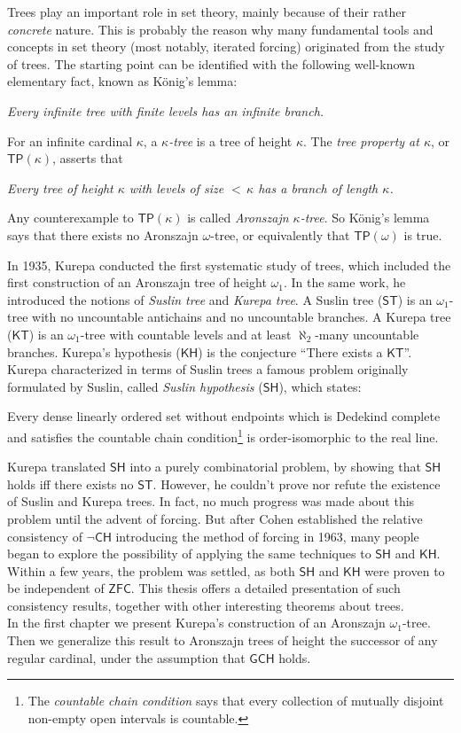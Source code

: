 \documentclass[11pt,a4paper]{report}
\theoremstyle{definition}
\theoremstyle{num.custom-title}
\theoremstyle{custom-title}
\newcommand{\ZFC}{\ensuremath{\mathsf{ZFC}}\xspace}
\newcommand{\TP}{\ensuremath{\mathsf{TP}}\xspace}
\newcommand{\GCH}{\ensuremath{\mathsf{GCH}}\xspace}
\newcommand{\CH}{\ensuremath{\mathsf{CH}}\xspace}
\newcommand{\SH}{\ensuremath{\mathsf{SH}}\xspace}
\newcommand{\ST}{\ensuremath{\mathsf{ST}}\xspace}
\newcommand{\KT}{\ensuremath{\mathsf{KT}}\xspace}
\newcommand{\KH}{\ensuremath{\mathsf{KH}}\xspace}
\begin{document}
Trees play an important role in set theory, mainly because of their rather \emph{concrete} nature. This is probably the reason why many fundamental tools and concepts in set theory (most notably, iterated forcing) originated from the study of trees. The starting point can be identified with the following well-known elementary fact, known as König's lemma:
\begin{center}
\emph{Every infinite tree with finite levels has an infinite branch.}
\end{center}
For an infinite cardinal $\kappa$, a \emph{$\kappa$-tree} is a tree of height $\kappa$. The \emph{tree property at $\kappa$}, or $\TP(\kappa)$, asserts that
\begin{center}
\emph{Every tree of height $\kappa$ with levels of size ${<} \, \kappa$ has a branch of length $\kappa$.}
\end{center}
Any counterexample to $\TP(\kappa)$ is called \emph{Aronszajn $\kappa$-tree}. So König's lemma says that there exists no Aronszajn $\omega$-tree, or equivalently that $\TP(\omega)$ is true.

In 1935, Kurepa conducted the first systematic study of trees, which included the first construction of an Aronszajn tree of height $\omega_1$. In the same work, he introduced the notions of \emph{Suslin tree} and \emph{Kurepa tree}. A Suslin tree (\ST) is an $\omega_1$-tree with no uncountable antichains and no uncountable branches. A Kurepa tree (\KT) is an $\omega_1$-tree with countable levels and at least $\aleph_2$-many uncountable branches. Kurepa's hypothesis (\KH) is the conjecture ``There exists a \KT''. Kurepa characterized in terms of Suslin trees a famous problem originally formulated by Suslin, called \emph{Suslin hypothesis} (\SH), which states:
\begin{center}
Every dense linearly ordered set without endpoints which is Dedekind complete and satisfies the countable chain condition\footnote{The \emph{countable chain condition} says that every collection of mutually disjoint non-empty open intervals is countable.} is order-isomorphic to the real line.
\end{center}
Kurepa translated \SH into a purely combinatorial problem, by showing that \SH holds iff there exists no \ST. However, he couldn't prove nor refute the existence of Suslin and Kurepa trees. In fact, no much progress was made about this problem until the advent of forcing. But after Cohen established the relative consistency of $\neg\CH$ introducing the method of forcing in 1963, many people began to explore the possibility of applying the same techniques to \SH and \KH. Within a few years, the problem was settled, as both \SH and \KH were proven to be independent of \ZFC. This thesis offers a detailed presentation of such consistency results, together with other interesting theorems about trees.
\\[10pt]
\indent In the first chapter we present Kurepa's construction of an Aronszajn $\omega_1$-tree. Then we generalize this result to Aronszajn trees of height the successor of any regular cardinal, under the assumption that \GCH holds.
\end{document}
